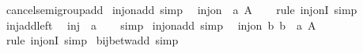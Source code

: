 \begin{isabellebody}
%
\endisadelimdocument
%
\isatagdocument
%
\isamarkuptrue%
%
\endisatagdocument
{\isafolddocument}%
%
\isadelimdocument
%
\endisadelimdocument
{}\isamarkupfalse%
\ cancel{\isacharunderscore}{\kern0pt}semigroup{\isacharunderscore}{\kern0pt}add\isanewline
{}\isanewline
\isanewline
{}\isamarkupfalse%
\ inj{\isacharunderscore}{\kern0pt}on{\isacharunderscore}{\kern0pt}add\ {\isacharbrackleft}{\kern0pt}simp{\isacharbrackright}{\kern0pt}{\isacharcolon}{\kern0pt}\isanewline
\ \ {\isachardoublequoteopen}inj{\isacharunderscore}{\kern0pt}on\ {\isacharparenleft}{\kern0pt}{\isacharparenleft}{\kern0pt}{\isacharplus}{\kern0pt}{\isacharparenright}{\kern0pt}\ a{\isacharparenright}{\kern0pt}\ A{\isachardoublequoteclose}\isanewline
%
\isadelimproof
\ \ %
\endisadelimproof
%
\isatagproof
{}\isamarkupfalse%
\ {\isacharparenleft}{\kern0pt}rule\ inj{\isacharunderscore}{\kern0pt}onI{\isacharparenright}{\kern0pt}\ simp%
\endisatagproof
{\isafoldproof}%
%
\isadelimproof
\isanewline
%
\endisadelimproof
\isanewline
{}\isamarkupfalse%
\ inj{\isacharunderscore}{\kern0pt}add{\isacharunderscore}{\kern0pt}left{\isacharcolon}{\kern0pt}\isanewline
\ \ {\isacartoucheopen}inj\ {\isacharparenleft}{\kern0pt}{\isacharparenleft}{\kern0pt}{\isacharplus}{\kern0pt}{\isacharparenright}{\kern0pt}\ a{\isacharparenright}{\kern0pt}{\isacartoucheclose}\isanewline
%
\isadelimproof
\ \ %
\endisadelimproof
%
\isatagproof
{}\isamarkupfalse%
\ simp%
\endisatagproof
{\isafoldproof}%
%
\isadelimproof
\isanewline
%
\endisadelimproof
\isanewline
{}\isamarkupfalse%
\ inj{\isacharunderscore}{\kern0pt}on{\isacharunderscore}{\kern0pt}add{\isacharprime}{\kern0pt}\ {\isacharbrackleft}{\kern0pt}simp{\isacharbrackright}{\kern0pt}{\isacharcolon}{\kern0pt}\isanewline
\ \ {\isachardoublequoteopen}inj{\isacharunderscore}{\kern0pt}on\ {\isacharparenleft}{\kern0pt}{\isasymlambda}b{\isachardot}{\kern0pt}\ b\ {\isacharplus}{\kern0pt}\ a{\isacharparenright}{\kern0pt}\ A{\isachardoublequoteclose}\isanewline
%
\isadelimproof
\ \ %
\endisadelimproof
%
\isatagproof
{}\isamarkupfalse%
\ {\isacharparenleft}{\kern0pt}rule\ inj{\isacharunderscore}{\kern0pt}onI{\isacharparenright}{\kern0pt}\ simp%
\endisatagproof
{\isafoldproof}%
%
\isadelimproof
\isanewline
%
\endisadelimproof
\isanewline
{}\isamarkupfalse%
\ bij{\isacharunderscore}{\kern0pt}betw{\isacharunderscore}{\kern0pt}add\ {\isacharbrackleft}{\kern0pt}simp{\isacharbrackright}{\kern0pt}{\isacharcolon}{\kern0pt}\isanewline

\end{isabellebody}

